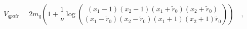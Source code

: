 \begin{equation}
V_{qpair} = 2 m_q\left(1 +
\frac{1}{\nu}\log\left(\frac{(x_1-1)(x_2-1)(x_1+\tilde{r}_0)(x_2+\tilde{r}_0)}{(x_1-\tilde{r}_0)(x_2-\tilde{r}_0)(x_1+1)(x_2+1)\tilde{r}_0}\right)\right)\quad, 
\label{Egainpoint}
\end{equation}

